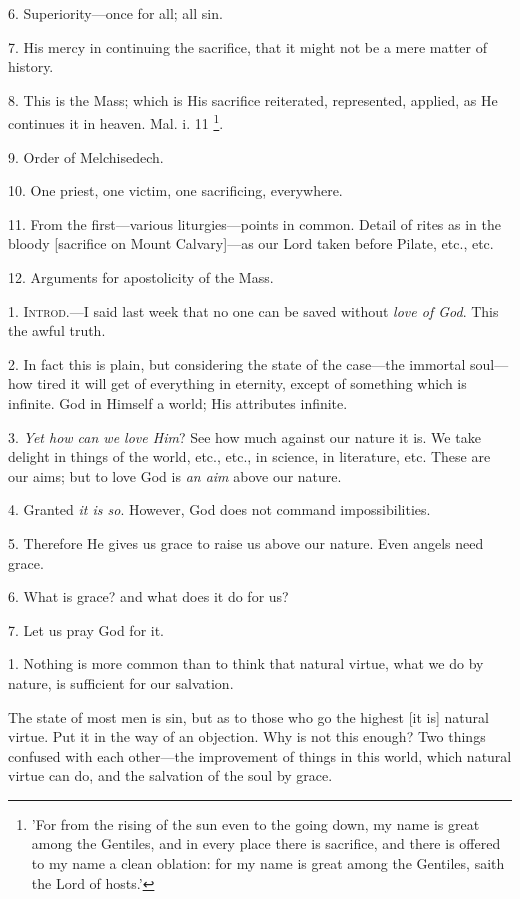 6. Superiority—once for all; all sin.

7. His mercy in continuing the sacrifice, that it
might not be a mere matter of history.

8. This is the Mass; which is His sacrifice
reiterated, represented, applied, as He continues it in heaven. Mal. i.
11 \footnote{'For from the rising of
the sun even to the going down, my name is great among the Gentiles,
and in every place there is sacrifice, and there is offered to my name
a clean oblation: for my name is great among the Gentiles, saith the
Lord of hosts.'}.

9. Order of Melchisedech.

10. One priest, one victim, one sacrificing,
everywhere.

11. From the first—various liturgies—points
in common. Detail of rites as in the bloody [sacrifice on Mount
Calvary]—as our Lord taken before Pilate, etc., etc.

12. Arguments for apostolicity of the Mass.


1. I\textsc{ntrod}.—I said last
week that no one can be saved without \emph{love of God}. This the
awful truth.

2. In fact this is plain, but considering the
state of the case—the immortal soul—how tired it will get of
everything in eternity, except of something which is infinite. God in
Himself a world; His attributes infinite.

3. \emph{Yet how can we love Him}? See how much
against our nature it is. We take delight in things of the world,
etc., etc., in science, in literature, etc. These are our aims; but to
love God is \emph{an aim} above our nature.

4. Granted \emph{it is so}. However, God does not
command impossibilities.

5. Therefore He gives us grace to raise us above
our nature. Even angels need grace.

6. What is grace? and what does it do for us?

7. Let us pray God for it.


1. Nothing is more common than to think that
natural virtue, what we do by nature, is sufficient for our salvation.

The state of most men is sin, but as to those who
go the highest [it is] natural virtue. Put it in the way of an
objection. Why is not this enough? Two things confused with each
other—the improvement of things in this world, which natural virtue
can do, and the salvation of the soul by grace.

